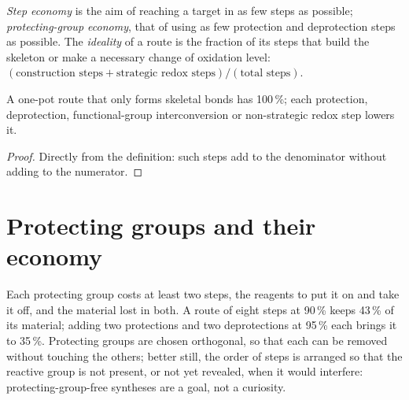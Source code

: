 \begin{definition}\label{def:b3:total-synthesis:economy}
\emph{Step economy} is the aim of reaching a target in as
few steps as possible; \emph{protecting-group economy},
that of using as few protection and deprotection steps as possible. The
\emph{ideality} of a route is the fraction of its steps that
build the skeleton or make a necessary change of oxidation level:
$(\text{construction steps} + \text{strategic redox steps})/(\text{total steps})$.
\end{definition}

\begin{proposition}\label{prop:b3:total-synthesis:ideality}
A one-pot route that only forms skeletal bonds has  100\,\%; each protection,
deprotection, functional-group interconversion or non-strategic redox step
lowers it.
\end{proposition}

\begin{proof}
Directly from the definition: such steps add to the denominator without adding
to the numerator.
\end{proof}

\section{Protecting groups and their economy}

Each protecting group costs at least two steps, the reagents to put it on and
take it off, and the material lost in both. A route of eight steps at 90\,\% keeps
43\,\% of its material; adding two protections and two deprotections at 95\,\% each
brings it to 35\,\%. Protecting groups are chosen orthogonal, so that each can be
removed without touching the others; better still, the order of steps is
arranged so that the reactive group is not present, or not yet revealed, when
it would interfere: protecting-group-free syntheses are a goal, not a curiosity.


